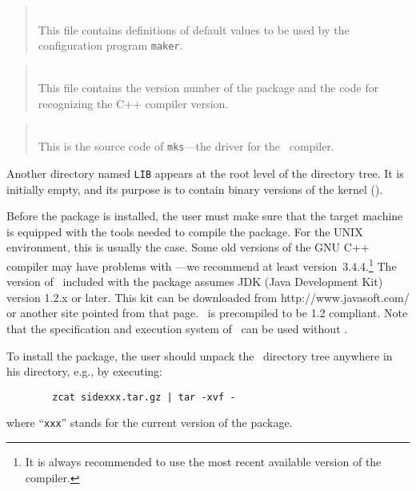 \begin{quote}
\noindent{}\\ \hspace{0in}
This file contains definitions of default values to be used by the
configuration program {\tt maker}.
\end{quote}

\begin{quote}
\noindent{}\\ \hspace{0in}
This file contains the version number of the package and the code for
recognizing the C++ compiler version.
\end{quote}

\begin{quote}
\noindent{}\\ \hspace{0in}
This is the source code of {\tt mks}---the driver for the \smurph\ compiler.
\end{quote}\medskip

Another directory named {\tt LIB} appears at the root level of the
directory tree.
It is initially empty, and its purpose is to contain binary versions
of the kernel ().

Before the package is installed, the user must make sure that the target
machine is equipped with the tools needed to compile the package.
For the UNIX environment, this is usually the case.
Some old versions of the GNU C++ compiler may have problems with
\smurph---we recommend at least version~3.4.4.\footnote{It is always
recommended to use the most recent available version of the
compiler.}
The version of \dsd\ included with the package assumes JDK (Java Development
Kit) version 1.2.x or later.
This kit can be downloaded from
{http://www.javasoft.com/}
or another site pointed from that page.
\dsd\ is precompiled to be 1.2 compliant.
Note that the specification and execution system of \smurph\ can be used
without \dsd.

To install the package, the user should unpack the \smurph\ directory tree
anywhere in his directory, e.g., by executing:
\begin{verbatim}
        zcat sidexxx.tar.gz | tar -xvf -
\end{verbatim}
\noindent
where ``{\tt xxx}'' stands for the current version of the package.

